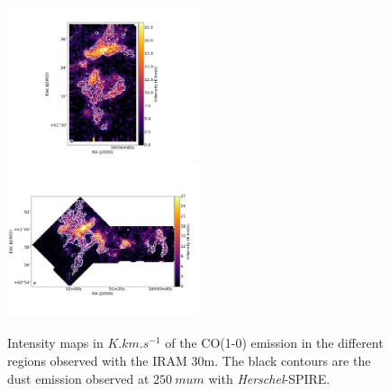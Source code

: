 \documentclass[traditabstract]{aa}
\begin{document}
\begin{figure}[h]
  \hspace{3mm}
  \includegraphics[height=4.5cm,trim=50 40 50 40,clip=true]{Figures/Draco6_stack.png} \\
  \includegraphics[height=4.5cm,trim=50 40 50 40,clip=true]{Figures/Draco2+9_rot_stack.png}
  \caption{\label{Draco_CO10} Intensity maps in $K.km.s^{-1}$ of the CO(1-0) emission in the different regions observed with the IRAM 30m. The black contours are the dust emission observed at $250\: mu m$ with \emph{Herschel}-SPIRE.}
\end{figure}
\end{document}

